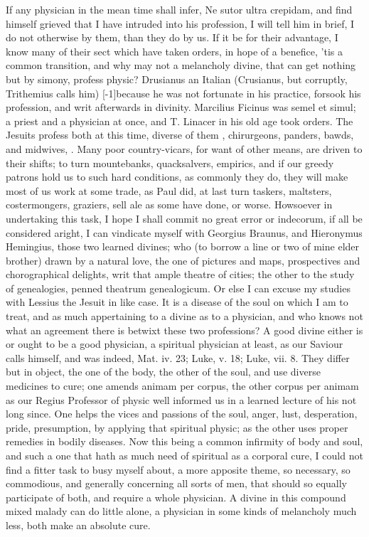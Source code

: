 {If any physician in the mean time shall infer, Ne sutor ultra crepidam,
and find himself grieved that I have intruded into his profession, I
will tell him in brief, I do not otherwise by them, than they do by us.
If it be for their advantage, I know many of their sect which have
taken orders, in hope of a benefice, 'tis a common transition, and why
may not a melancholy divine, that can get nothing but by simony,
profess physic? Drusianus an Italian (Crusianus, but corruptly,
Trithemius calls him) [-1\baselineskip]because he was not fortunate in his
practice, forsook his profession, and writ afterwards in divinity.
Marcilius Ficinus was semel et simul; a priest and a physician at once,
and T. Linacer in his old age took orders. The Jesuits profess
both at this time, diverse of them , chirurgeons,
panders, bawds, and midwives, \etc. Many poor country-vicars, for want of
other means, are driven to their shifts; to turn mountebanks,
quacksalvers, empirics, and if our greedy patrons hold us to such hard
conditions, as commonly they do, they will make most of us work at some
trade, as Paul did, at last turn taskers, maltsters, costermongers,
graziers, sell ale as some have done, or worse. Howsoever in
undertaking this task, I hope I shall commit no great error or
indecorum, if all be considered aright, I can vindicate myself with
Georgius Braunus, and Hieronymus Hemingius, those two learned divines;
who (to borrow a line or two of mine elder brother) drawn by a
natural love, the one of pictures and maps, prospectives and
chorographical delights, writ that ample theatre of cities; the other
to the study of genealogies, penned theatrum genealogicum. Or else I
can excuse my studies with Lessius the Jesuit in like case. It is
a disease of the soul on which I am to treat, and as much appertaining
to a divine as to a physician, and who knows not what an agreement
there is betwixt these two professions? A good divine either is or
ought to be a good physician, a spiritual physician at least, as our
Saviour calls himself, and was indeed, Mat. iv. 23; Luke, v. 18; Luke,
vii. 8. They differ but in object, the one of the body, the other of
the soul, and use diverse medicines to cure; one amends animam per
corpus, the other corpus per animam as our Regius Professor of
physic well informed us in a learned lecture of his not long since. One
helps the vices and passions of the soul, anger, lust, desperation,
pride, presumption, \etc by applying that spiritual physic; as the other
uses proper remedies in bodily diseases. Now this being a common
infirmity of body and soul, and such a one that hath as much need of
spiritual as a corporal cure, I could not find a fitter task to busy
myself about, a more apposite theme, so necessary, so commodious, and
generally concerning all sorts of men, that should so equally
participate of both, and require a whole physician. A divine in this
compound mixed malady can do little alone, a physician in some kinds of
melancholy much less, both make an absolute cure.

}
